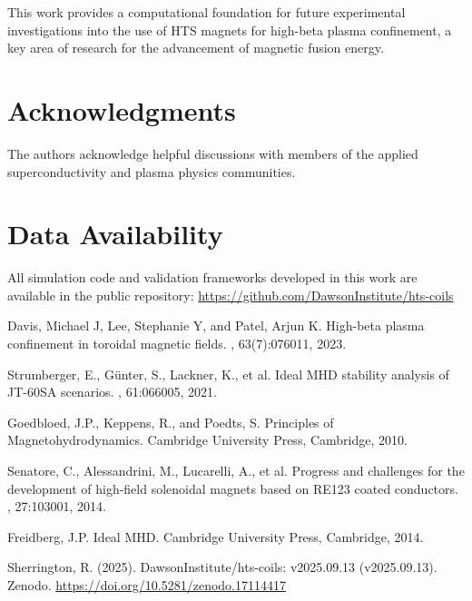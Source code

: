\documentclass[12pt,a4paper]{article}
\begin{document}
This work provides a computational foundation for future experimental investigations into the use of HTS magnets for high-beta plasma confinement, a key area of research for the advancement of magnetic fusion energy.

\section*{Acknowledgments}

The authors acknowledge helpful discussions with members of the applied superconductivity and plasma physics communities.



\section*{Data Availability}

All simulation code and validation frameworks developed in this work are available in the public repository: \url{https://github.com/DawsonInstitute/hts-coils}

\begin{thebibliography}{99}

Davis, Michael J, Lee, Stephanie Y, and Patel, Arjun K.
\newblock High-beta plasma confinement in toroidal magnetic fields.
, 63(7):076011, 2023.

Strumberger, E., Günter, S., Lackner, K., et al.
\newblock Ideal MHD stability analysis of JT-60SA scenarios.
, 61:066005, 2021.

Goedbloed, J.P., Keppens, R., and Poedts, S.
\newblock Principles of Magnetohydrodynamics.
\newblock Cambridge University Press, Cambridge, 2010.

Senatore, C., Alessandrini, M., Lucarelli, A., et al.
\newblock Progress and challenges for the development of high-field solenoidal magnets based on RE123 coated conductors.
, 27:103001, 2014.

Freidberg, J.P.
\newblock Ideal MHD.
\newblock Cambridge University Press, Cambridge, 2014.

Sherrington, R. (2025). 
\newblock DawsonInstitute/hts-coils: v2025.09.13 (v2025.09.13). 
\newblock Zenodo. \url{https://doi.org/10.5281/zenodo.17114417}


\end{thebibliography}
\end{document}
